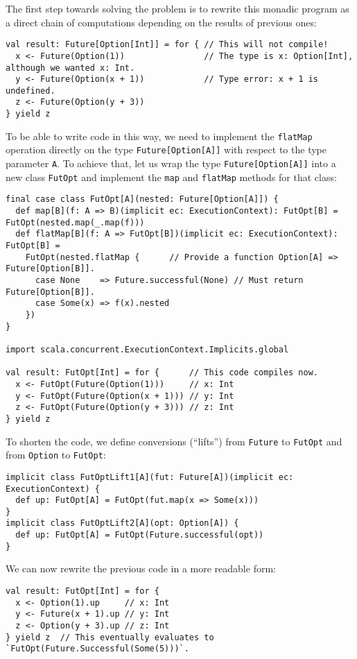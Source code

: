The first step towards solving the problem is to rewrite this monadic
program as a direct chain of computations depending on the results
of previous ones:
\begin{lstlisting}
val result: Future[Option[Int]] = for { // This will not compile!
  x <- Future(Option(1))                // The type is x: Option[Int], although we wanted x: Int.
  y <- Future(Option(x + 1))            // Type error: x + 1 is undefined.
  z <- Future(Option(y + 3))
} yield z
\end{lstlisting}
To be able to write code in this way, we need to implement the \lstinline!flatMap!
operation directly on the type \lstinline!Future[Option[A]]! with
respect to the type parameter \lstinline!A!. To achieve that, let
us wrap the type \lstinline!Future[Option[A]]! into a new class \lstinline!FutOpt!
and implement the \lstinline!map! and \lstinline!flatMap! methods
for that class:
\begin{lstlisting}
final case class FutOpt[A](nested: Future[Option[A]]) {
  def map[B](f: A => B)(implicit ec: ExecutionContext): FutOpt[B] = FutOpt(nested.map(_.map(f)))
  def flatMap[B](f: A => FutOpt[B])(implicit ec: ExecutionContext): FutOpt[B] =
    FutOpt(nested.flatMap {      // Provide a function Option[A] => Future[Option[B]].
      case None    => Future.successful(None) // Must return Future[Option[B]].
      case Some(x) => f(x).nested
    })
}

import scala.concurrent.ExecutionContext.Implicits.global

val result: FutOpt[Int] = for {      // This code compiles now.
  x <- FutOpt(Future(Option(1)))     // x: Int
  y <- FutOpt(Future(Option(x + 1))) // y: Int
  z <- FutOpt(Future(Option(y + 3))) // z: Int
} yield z
\end{lstlisting}
To shorten the code, we define conversions (\textsf{``}lifts\textsf{''}) from \lstinline!Future!
to \lstinline!FutOpt! and from \lstinline!Option! to \lstinline!FutOpt!:
\begin{lstlisting}
implicit class FutOptLift1[A](fut: Future[A])(implicit ec: ExecutionContext) {
  def up: FutOpt[A] = FutOpt(fut.map(x => Some(x)))
}
implicit class FutOptLift2[A](opt: Option[A]) {
  def up: FutOpt[A] = FutOpt(Future.successful(opt))
}
\end{lstlisting}
We can now rewrite the previous code in a more readable form:
\begin{lstlisting}
val result: FutOpt[Int] = for {
  x <- Option(1).up     // x: Int
  y <- Future(x + 1).up // y: Int
  z <- Option(y + 3).up // z: Int
} yield z  // This eventually evaluates to `FutOpt(Future.Successful(Some(5)))`.
\end{lstlisting}

